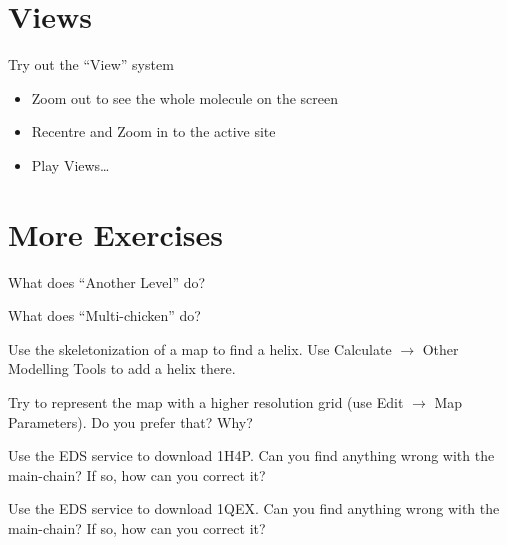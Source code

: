 \documentclass{article}
\begin{document}
\section{Views}

Try out the ``View'' system
\begin{itemize}
\item Zoom out to see the whole molecule on the screen
\item Recentre and Zoom in to the active site
\item Play Views\ldots
\end{itemize}


\section{More Exercises}
\begin{trivlist}
\item What does ``Another Level'' do? 
\item What does ``Multi-chicken'' do?
\item Use the skeletonization of a map to find a helix.  Use
  \textsf{Calculate $\rightarrow$ Other Modelling Tools} to add a
  helix there.
\item Try to represent the map with a higher resolution grid (use
  \textsf{Edit $\rightarrow$ Map Parameters}).  Do you prefer that?
  Why?
\item Use the EDS service to download 1H4P.  Can you find anything
  wrong with the main-chain?  If so, how can you correct it?
\item Use the EDS service to download 1QEX.  Can you find anything
  wrong with the main-chain?  If so, how can you correct it?
\end{trivlist}
\end{document}
